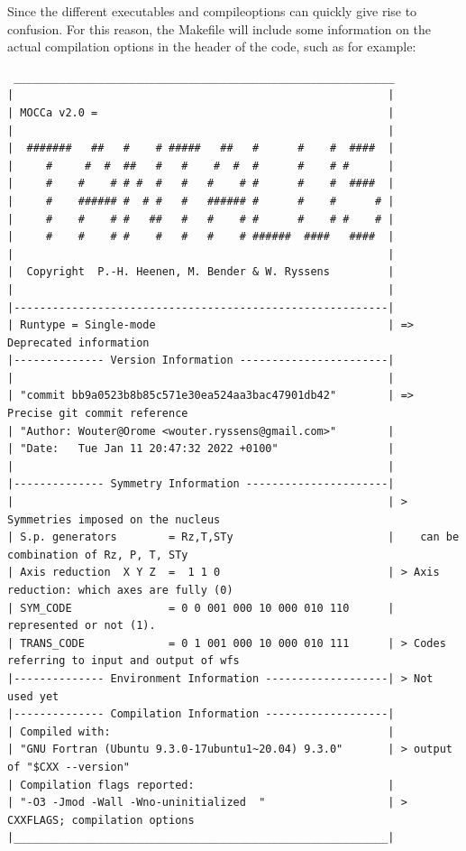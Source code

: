 \documentclass[print,amsmath,amssymb,aps,prc,nofootinbib,notitlepage]{revtex4-1}
\begin{document}
Since the different executables and compileoptions can quickly give rise to 
confusion. For this reason, the Makefile will include some information on the 
actual compilation options in the header of the code, such as for example:

\begin{Verbatim}
 ___________________________________________________________
|                                                          |
| MOCCa v2.0 =                                             |
|                                                          |
|  #######   ##   #    # #####   ##   #      #    #  ####  |
|     #     #  #  ##   #   #    #  #  #      #    # #      |
|     #    #    # # #  #   #   #    # #      #    #  ####  |
|     #    ###### #  # #   #   ###### #      #    #      # |
|     #    #    # #   ##   #   #    # #      #    # #    # |
|     #    #    # #    #   #   #    # ######  ####   ####  |
|                                                          |
|  Copyright  P.-H. Heenen, M. Bender & W. Ryssens         |
|                                                          |
|----------------------------------------------------------|
| Runtype = Single-mode                                    | => Deprecated information
|-------------- Version Information -----------------------|
|                                                          |
| "commit bb9a0523b8b85c571e30ea524aa3bac47901db42"        | => Precise git commit reference
| "Author: Wouter@Orome <wouter.ryssens@gmail.com>"        |
| "Date:   Tue Jan 11 20:47:32 2022 +0100"                 |
|                                                          |
|-------------- Symmetry Information ----------------------|
|                                                          | > Symmetries imposed on the nucleus
| S.p. generators        = Rz,T,STy                        |    can be combination of Rz, P, T, STy
| Axis reduction  X Y Z  =  1 1 0                          | > Axis reduction: which axes are fully (0) 
| SYM_CODE               = 0 0 001 000 10 000 010 110      |    represented or not (1).
| TRANS_CODE             = 0 1 001 000 10 000 010 111      | > Codes referring to input and output of wfs
|-------------- Environment Information -------------------| > Not used yet
|-------------- Compilation Information -------------------|
| Compiled with:                                           |
| "GNU Fortran (Ubuntu 9.3.0-17ubuntu1~20.04) 9.3.0"       | > output of "$CXX --version"
| Compilation flags reported:                              | 
| "-O3 -Jmod -Wall -Wno-uninitialized  "                   | > CXXFLAGS; compilation options 
|__________________________________________________________|

\end{Verbatim}
\end{document}
